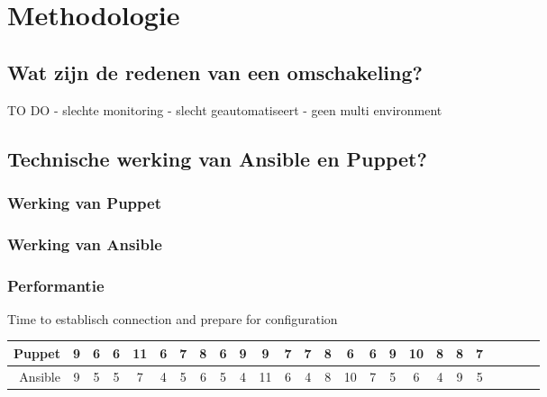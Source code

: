 
\chapter{Methodologie}
\label{ch:methodologie}


\section{Wat zijn de redenen van een omschakeling?}
\label{sec:methodologie-redenen-omschakeling}

TO DO
- slechte monitoring
- slecht geautomatiseert 
- geen multi environment

\section{Technische werking van Ansible en Puppet?}
\label{sec:methodologie-technische-verschillen}

\subsection{Werking van Puppet}

\subsection{Werking van Ansible}


\subsection{Performantie}
  Time to establisch connection and prepare for configuration \newline
\begin{tabular}{| r |c |c |c |c |c |c |c |c |c |c |c |c |c |c |c |c |c |c |c |c |c |c |c |c |}
  \hline	
  
 
  		
Puppet & 9 & 6 & 6 & 	11 & 	6 & 7 & 8 & 6 & 9 & 9 & 7 & 7 &	 8 & 6 & 6 & 9 & 10 & 8 & 8 & 7\\
   \hline
  Ansible & 9 & 5 & 5 & 7 & 4 & 5 & 6 & 5 & 4 & 11 & 6 & 4 & 8 & 10 & 7 & 5 & 6 & 4 & 9 & 5 \\
  \hline  
\end{tabular}



